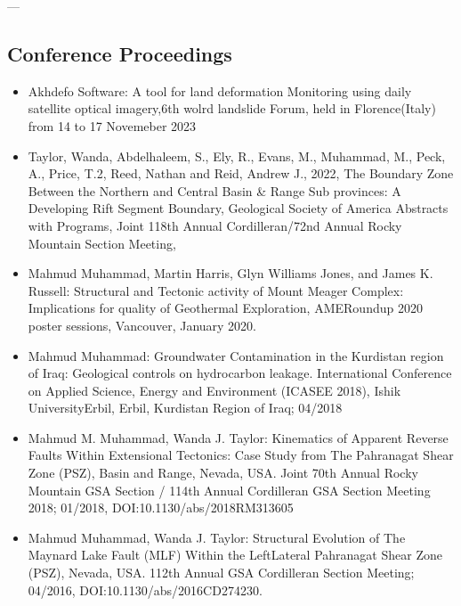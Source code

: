 \documentclass[letterpaper,10pt,english]{sphinxmanual}
\begin{document}
\sphinxAtStartPar
—


\subsection{Conference Proceedings}
\label{\detokenize{CV_Mahmud_2023:conference-proceedings}}\begin{itemize}
\item {} 
\sphinxAtStartPar
Akhdefo Software: A tool for land deformation Monitoring using daily satellite optical imagery,6th wolrd landslide Forum, held in Florence(Italy) from 14 to 17 Novemeber 2023

\item {} 
\sphinxAtStartPar
Taylor, Wanda, Abdelhaleem, S., Ely, R., Evans, M., Muhammad, M., Peck, A., Price, T.2, Reed,
Nathan and Reid, Andrew J., 2022, The Boundary Zone Between the Northern and Central Basin \&
Range Sub provinces: A Developing Rift Segment Boundary, Geological Society of America
Abstracts with Programs, Joint 118th Annual Cordilleran/72nd Annual Rocky Mountain Section Meeting, 

\item {} 
\sphinxAtStartPar
Mahmud Muhammad, Martin Harris, Glyn Williams Jones, and James K. Russell: Structural and Tectonic activity of Mount Meager Complex: Implications for quality of Geothermal Exploration, AME\sphinxhyphen{}Roundup 2020 poster sessions, Vancouver, January 2020.

\item {} 
\sphinxAtStartPar
Mahmud Muhammad: Groundwater Contamination in the Kurdistan region of Iraq: Geological controls on hydrocarbon leakage. International Conference on Applied Science, Energy and Environment (ICASEE\sphinxhyphen{} 2018), Ishik University\sphinxhyphen{}Erbil, Erbil, Kurdistan Region of Iraq; 04/2018

\item {} 
\sphinxAtStartPar
Mahmud M. Muhammad, Wanda J. Taylor: Kinematics of Apparent Reverse Faults Within Extensional Tectonics: Case Study from The Pahranagat Shear Zone (PSZ), Basin and Range,
Nevada, USA. Joint 70th Annual Rocky Mountain GSA Section / 114th Annual Cordilleran GSA Section Meeting \sphinxhyphen{} 2018; 01/2018, DOI:10.1130/abs/2018RM\sphinxhyphen{}313605

\item {} 
\sphinxAtStartPar
Mahmud Muhammad, Wanda J. Taylor: Structural Evolution of The Maynard Lake Fault (MLF) Within the Left\sphinxhyphen{}Lateral Pahranagat Shear Zone (PSZ), Nevada, USA. 112th Annual GSA Cordilleran Section Meeting; 04/2016, DOI:10.1130/abs/2016CD\sphinxhyphen{}274230.

\end{itemize}
\end{document}
